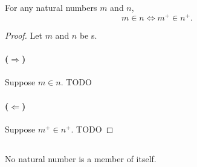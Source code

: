 \documentclass{report}
\begin{document}
\subsection{}%

\begin{lemma}[4L(a)]

  For any natural numbers $m$ and $n$, $$m \in n \iff m^+ \in n^+.$$

\end{lemma}

\begin{proof}


  Let $m$ and $n$ be s.

  \paragraph{($\Rightarrow$)}%

    Suppose $m \in n$.
    TODO

  \paragraph{($\Leftarrow$)}%

    Suppose $m^+ \in n^+$.
    TODO

\end{proof}

\subsection{}%

\begin{lemma}[4L(b)]

  No natural number is a member of itself.

\end{lemma}
\end{document}
